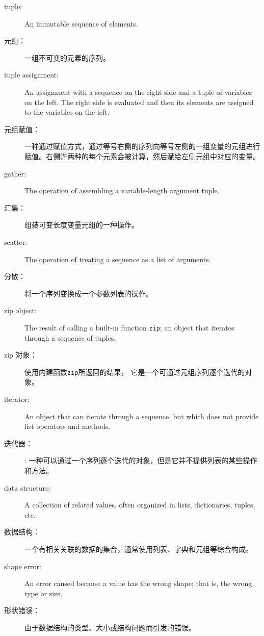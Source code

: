 \begin{description}

\item[tuple:] An immutable sequence of elements.

\item[元组：] 一组不可变的元素的序列。

\item[tuple assignment:] An assignment with a sequence on the
right side and a tuple of variables on the left.  The right
side is evaluated and then its elements are assigned to the
variables on the left.

\item[元组赋值：]一种通过赋值方式，通过等号右侧的序列向等号左侧的一组变量的元组进行赋值。右侧许两种的每个元素会被计算，然后赋给左侧元组中对应的变量。
 

\item[gather:] The operation of assembling a variable-length
argument tuple.

\item[汇集：] 组装可变长度变量元组的一种操作。

\item[scatter:] The operation of treating a sequence as a list of
arguments.

\item[分散：] 将一个序列变换成一个参数列表的操作。


\item[zip object:] The result of calling a built-in function {\tt zip};
an object that iterates through a sequence of tuples.

\item[zip 对象：] 使用内建函数\lstinline{zip}所返回的结果， 它是一个可通过元组序列逐个迭代的对象。
 

\item[iterator:] An object that can iterate through a sequence, but
which does not provide list operators and methods.

\item[迭代器：]: 一种可以通过一个序列逐个迭代的对象，但是它并不提供列表的某些操作和方法。

\item[data structure:] A collection of related values, often
organized in lists, dictionaries, tuples, etc.

\item[数据结构：] 一个有相关关联的数据的集合，通常使用列表、字典和元组等综合构成。

\item[shape error:] An error caused because a value has the
wrong shape; that is, the wrong type or size.

\item[形状错误：] 由于数据结构的类型、大小或结构问题而引发的错误。

\end{description}


